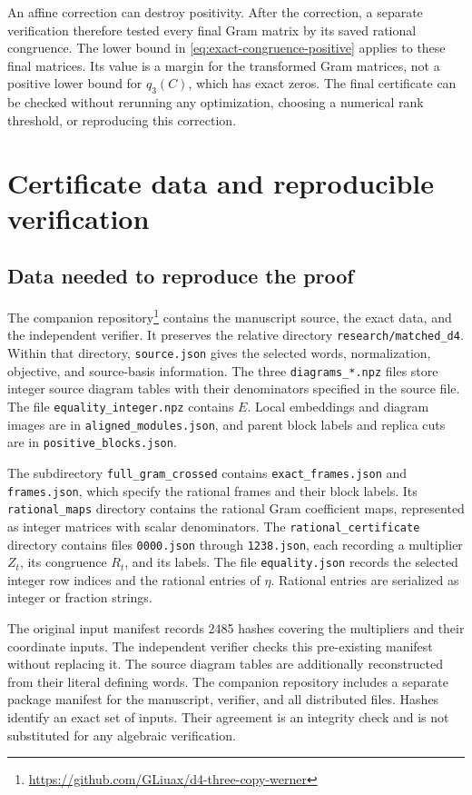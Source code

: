 \documentclass[aps,pra,reprint,superscriptaddress,amsmath,amssymb,floatfix,nofootinbib]{revtex4-2}
\begin{document}
An affine correction can destroy positivity. After the correction, a
separate verification therefore tested every final Gram matrix by its
saved rational congruence. The lower bound in
\cref{eq:exact-congruence-positive} applies to these final matrices.
Its value is a margin for the transformed Gram matrices, not a positive
lower bound for $q_3(C)$, which has exact zeros.
The final certificate can be checked without rerunning any optimization,
choosing a numerical rank threshold, or reproducing this correction.

\section{Certificate data and reproducible verification}
\label{app:verification}

\subsection{Data needed to reproduce the proof}

The companion repository\footnote{\url{https://github.com/GLiuax/d4-three-copy-werner}} contains
the manuscript source, the exact data, and the independent verifier.
It preserves the relative directory \nolinkurl{research/matched_d4}.
Within that directory, \nolinkurl{source.json} gives the selected words,
normalization, objective, and source-basis information.
The three \nolinkurl{diagrams_*.npz} files store integer source diagram
tables with their denominators specified in the source file.
The file \nolinkurl{equality_integer.npz} contains $E$.
Local embeddings and diagram images are in
\nolinkurl{aligned_modules.json}, and parent block labels and replica
cuts are in \nolinkurl{positive_blocks.json}.

The subdirectory \nolinkurl{full_gram_crossed} contains
\nolinkurl{exact_frames.json} and \nolinkurl{frames.json}, which specify
the rational frames and their block labels.
Its \nolinkurl{rational_maps} directory contains the rational Gram
coefficient maps, represented as integer matrices with scalar
denominators.
The \nolinkurl{rational_certificate} directory contains files
\nolinkurl{0000.json} through \nolinkurl{1238.json}, each recording a
multiplier $Z_t$, its congruence $R_t$, and its labels.
The file \nolinkurl{equality.json} records the selected integer row
indices and the rational entries of $\eta$.
Rational entries are serialized as integer or fraction strings.

The original input manifest records 2485 hashes covering the multipliers
and their coordinate inputs. The independent verifier checks this
pre-existing manifest without replacing it.
The source diagram tables are additionally reconstructed from their
literal defining words.
The companion repository includes a separate package manifest for the
manuscript, verifier, and all distributed files.
Hashes identify an exact set of inputs. Their agreement is an integrity
check and is not substituted for any algebraic verification.
\end{document}
